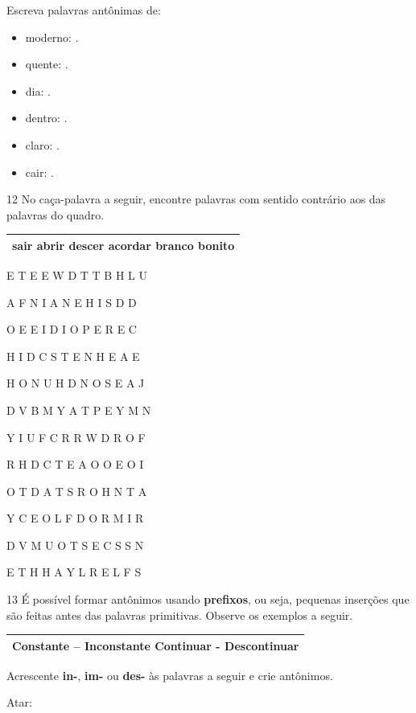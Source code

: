 \begin{boxlist}
\begin{escolha}
\item Escreva palavras antônimas de:

\begin{itemize}
\item
  moderno: .
\item
  quente: .
\item
  dia: .
\item
  dentro: .
\item
  claro: .
\item
  cair: .
\end{itemize}
\end{escolha}

\num{12} No caça-palavra a seguir, encontre palavras com sentido contrário aos das
palavras do quadro.

\begin{longtable}[]{@{}l@{}}
\toprule
\textbf{sair abrir descer acordar branco bonito}\tabularnewline
\bottomrule
\end{longtable}

E T E E W D T T B H L U

A F N I A N E H I S D D

O E E I D I O P E R E C

H I D C S T E N H E A E

H O N U H D N O S E A J

D V B M Y A T P E Y M N

Y I U F C R R W D R O F

R H D C T E A O O E O I

O T D A T S R O H N T A

Y C E O L F D O R M I R

D V M U O T S E C S S N

E T H H A Y L R E L F S

\num{13} É possível formar antônimos usando \textbf{prefixos}, ou seja, pequenas inserções
que são feitas antes das palavras primitivas. Observe os exemplos a seguir.

\begin{longtable}[]{@{}l@{}}
\toprule
Constante -- \textbf{In}constante Continuar -
\textbf{Des}continuar\tabularnewline
\bottomrule
\end{longtable}

Acrescente \textbf{in-}, \textbf{im-} ou \textbf{des-} às palavras a seguir e crie antônimos.

\begin{escolha}
\item Atar: 


\end{escolha}
\end{boxlist}
